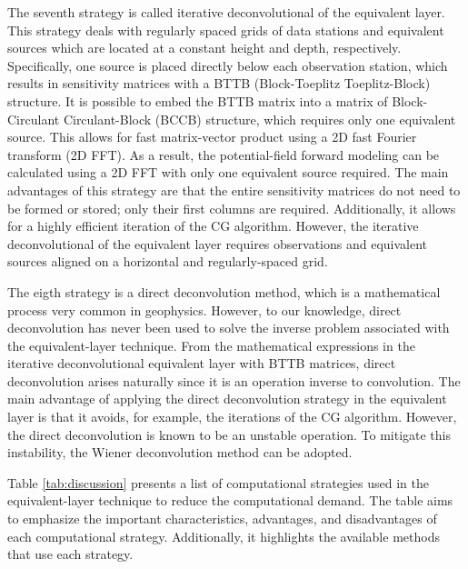 The seventh strategy is called iterative deconvolutional of the equivalent layer.
This strategy deals with regularly spaced grids of data stations and equivalent sources which are located at a constant height and depth, respectively. 
Specifically, one source is placed directly below each observation station, which results in sensitivity matrices with a BTTB (Block-Toeplitz Toeplitz-Block) structure. 
It is possible to embed the BTTB matrix into a matrix of Block-Circulant Circulant-Block (BCCB) structure, which requires only one equivalent source. 
This allows for fast matrix-vector product using a 2D fast Fourier transform (2D FFT). 
As a result, the potential-field forward modeling can be calculated using 
a 2D FFT with only one equivalent source required. 
The main advantages of this strategy are that the entire sensitivity matrices do not need to be formed or stored; only their first columns are required. Additionally, it allows for a highly efficient iteration of the CG algorithm.
However, the iterative deconvolutional of the equivalent layer requires 
observations and equivalent sources aligned on a horizontal and regularly-spaced grid.

The eigth strategy is a direct deconvolution method, which is a mathematical process very common in geophysics. 
However, to our knowledge, direct deconvolution has never been used to solve the inverse problem associated with the equivalent-layer technique. 
From the mathematical expressions in the iterative deconvolutional equivalent layer with BTTB matrices, direct deconvolution arises naturally since it is an operation inverse to convolution. 
The main advantage of applying the direct deconvolution strategy in the equivalent layer is that it avoids, for example, the  iterations of the CG algorithm. 
However, the direct deconvolution is known to be an unstable operation.
To mitigate this instability, the Wiener deconvolution method can be adopted.

Table \ref{tab:discussion} presents a list of computational strategies used in the equivalent-layer technique to reduce the computational demand.
The table aims to emphasize the important characteristics, advantages, and disadvantages of each computational strategy. 
Additionally, it highlights the available methods that use each strategy.


